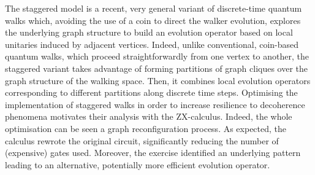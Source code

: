 %
%
%


The staggered model is a recent, very general variant of discrete-time quantum walks which, avoiding the use of a coin to direct the walker evolution, explores the underlying graph structure to build an evolution operator based on local unitaries induced by adjacent vertices. Indeed, unlike conventional, coin-based quantum walks, which proceed straightforwardly from one vertex to another, the staggered variant takes advantage of forming partitions of graph cliques over the graph structure of the walking space. Then, it combines  local evolution operators  corresponding to different partitions  along discrete time steps.  Optimising  the implementation of staggered walks in order to increase resilience to decoherence phenomena motivates their analysis with the ZX-calculus. Indeed,  the whole optimisation  can be seen a graph reconfiguration process. As expected, the calculus rewrote the original circuit, significantly reducing the number of (expensive) gates used. Moreover, the exercise identified an underlying pattern leading to an alternative, potentially more efficient evolution operator.



%
%
%
%
%
%
%
%
